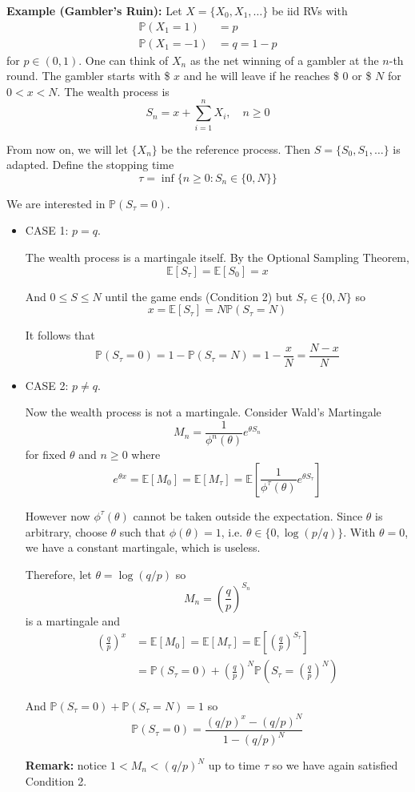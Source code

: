 \documentclass[12pt]{report}
\renewcommand{\P}{\mathbb{P}}
\newcommand{\E}{\mathbb{E}}
\begin{document}
    \textbf{Example (Gambler's Ruin):} Let $X = \{X_0, X_1, \dots\}$ be iid RVs with 
    \begin{align*}
        \P(X_1 = 1) &= p\\
        \P(X_1 = -1) &= q = 1 - p
    \end{align*}
    for $p \in (0, 1)$. One can think of $X_n$ as the net winning of a gambler at the $n$-th round. The gambler starts with \$ $x$ and he will leave if he reaches \$ $0$ or \$ $N$ for $0 < x < N$. The wealth process is 
    \[S_n = x + \sum_{i=1}^{n} X_i, \quad n \geq 0 \]

    From now on, we will let $\{X_n\}$ be the reference process. Then $S = \{S_0, S_1, \dots\}$ is adapted. Define the stopping time 
    \[\tau = \inf\{n \geq 0: S_n \in \{0, N\}\}\]

    We are interested in $\P(S_{\tau} = 0)$. 

    \begin{itemize}
        \item CASE 1: $p = q$. 
        
        The wealth process is a martingale itself. By the Optional Sampling Theorem, 
        \[\E[S_{\tau}] = \E[S_0] = x\] 

        And $0 \leq S \leq N$ until the game ends (Condition 2) but $S_{\tau} \in \{0, N\}$ so 
        \[x = \E[S_{\tau}] = N\P(S_{\tau} = N)\] 

        It follows that 
        \[\P(S_{\tau} =0 ) = 1 - \P(S_{\tau} = N) = 1 - \frac{x}{N} = \frac{N - x}{N}\]

        \item CASE 2: $p \neq q$. 
        
        Now the wealth process is not a martingale. Consider Wald's Martingale 
        \[M_n = \frac{1}{\phi^n(\theta)} e^{\theta S_n}\]
        for fixed $\theta$ and $n \geq 0$ where 
        \[e^{\theta x} = \E[M_0] = \E[M_{\tau}] = \E\left[\frac{1}{\phi^{\tau}(\theta)}e^{\theta S_{\tau}}\right]\]

        However now $\phi^{\tau}(\theta)$ cannot be taken outside the expectation. Since $\theta$ is arbitrary, choose $\theta$ such that $\phi(\theta) = 1$, i.e. $\theta \in \{0, \log(p/q)\}$. With $\theta = 0$, we have a constant martingale,  which is useless. 

        Therefore, let $\theta = \log(q/p)$ so 
        \[M_n = \left(\frac{q}{p}\right)^{S_n} \]
        is a martingale and 
        \begin{align*}
            \left(\frac{q}{p}\right)^x &= \E[M_0] = \E[M_{\tau}] = \E\left[\left(\frac{q}{p}\right)^{S_{\tau}} \right]\\ 
            &= \P(S_{\tau} = 0) + \left(\frac{q}{p}\right)^N \P(S_{\tau} = \left(\frac{q}{p}\right)^N)
        \end{align*}

        And $\P(S_{\tau} = 0) + \P(S_{\tau} = N) = 1$ so 
        \[\P(S_{\tau} = 0) = \frac{(q/p)^x - (q/p)^N}{1 - (q/p)^N}\]

        \textbf{Remark:} notice $1 < M_n < (q/p)^N$ up to time $\tau$ so we have again satisfied Condition 2.
    \end{itemize}
\end{document}
